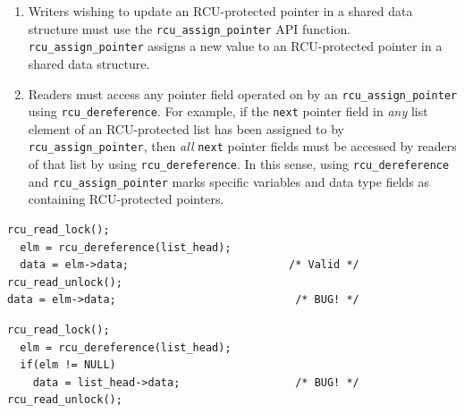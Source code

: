 \documentclass[preprint]{sigplanconf}
\begin{document}
\begin{enumerate}
	\item Writers wishing to update an RCU-protected pointer in a shared data structure must use the \texttt{rcu\_assign\_pointer} API function. \texttt{rcu\_assign\_pointer} assigns a new value to an RCU-protected pointer in a shared data structure.

	\item Readers must access any pointer field operated on by an \texttt{rcu\_\linebreak[0]assign\_pointer} using \texttt{rcu\_\linebreak[0]dereference}. For example, if the \texttt{next} pointer field in \emph{any} list element of an RCU-protected list has been assigned to by \texttt{rcu\_assign\_\linebreak[0]pointer}, then \emph{all} \texttt{next} pointer fields must be accessed by readers of that list by using \texttt{rcu\_\linebreak[0]dereference}. In this sense, using \texttt{rcu\_\linebreak[0]dereference} and \texttt{rcu\_assign\_\linebreak[0]pointer} marks specific variables and data type fields as containing RCU-protected pointers.

\end{enumerate}

%


\newsavebox\rcuexistencebug
\begin{lrbox}{\rcuexistencebug}
\begin{lstlisting}[basicstyle=\scriptsize\ttfamily]
rcu_read_lock();
  elm = rcu_dereference(list_head);
  data = elm->data;                         /* Valid */
rcu_read_unlock();
data = elm->data;                            /* BUG! */
\end{lstlisting}
\end{lrbox}

\newsavebox\rcuderefbug
\begin{lrbox}{\rcuderefbug}
\begin{lstlisting}[basicstyle=\scriptsize\ttfamily]
rcu_read_lock();
  elm = rcu_dereference(list_head);
  if(elm != NULL)
    data = list_head->data;                  /* BUG! */
rcu_read_unlock();
\end{lstlisting}
\end{lrbox}
\end{document}
